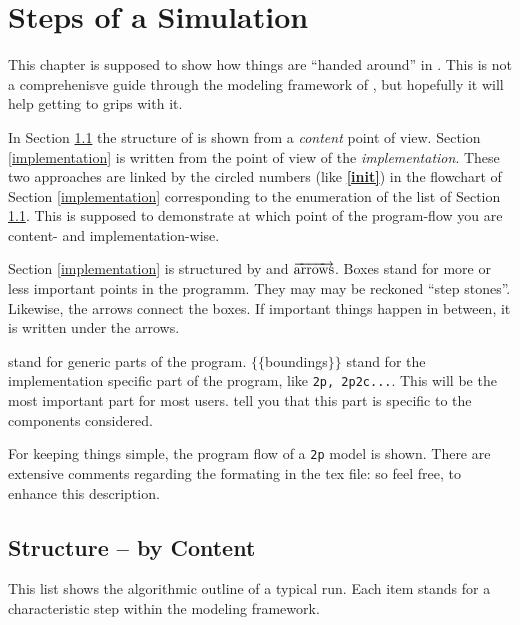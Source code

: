 \section{Steps of a \Dumux Simulation}
\label{flow}


This chapter is supposed to show how things are ``handed around'' in \Dumux. This
is not a comprehenisve guide through the modeling framework of \Dumux, but
hopefully it will help getting to grips with it.

In Section \ref{content} the structure of \Dumux is shown from a \emph{content}
point of view.
Section \ref{implementation} is written from the point of view of the \emph{implementation}.
These two approaches are linked by the circled numbers (like \textbf{\textcircled{\ref{init}}})
in the flowchart of Section \ref{implementation} corresponding to the enumeration
of the list of Section \ref{content}. This is supposed to demonstrate at which point
of the program-flow you are content- and implementation-wise.

Section \ref{implementation} is structured by  and
$\overrightarrow{\textnormal{arrows}}$. Boxes stand for more or less important
points in the programm. They may may be reckoned ``step stones''. Likewise, the
arrows connect the boxes. If important things happen in between, it is written
under the arrows.

 stand for generic parts of the program. 
$\lbrace\lbrace$boundings$\rbrace\rbrace$ stand for the implementation specific
part of the program, like \verb+2p, 2p2c...+. This will be the most important
part for most users.  tell you that this part is specific
to the components considered.

For keeping things simple, the program flow of a \verb+2p+ model is shown.
There are extensive comments regarding the formating in the tex file: so feel free,
to enhance this description.

\subsection{Structure -- by Content}
\label{content}
This list shows the algorithmic outline of a typical \Dumux run. Each item stands
for a characteristic step within the modeling framework.

